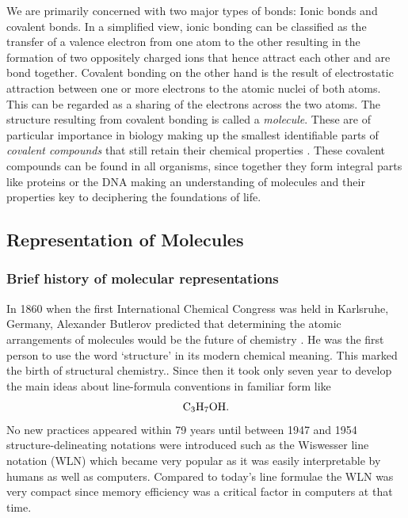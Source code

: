 We are primarily concerned with two major types of bonds: Ionic bonds and covalent bonds.
In a simplified view, ionic bonding can be classified  as the transfer of a valence electron from one atom to the other resulting in the formation of two oppositely charged ions that hence attract each other and are bond together. Covalent bonding on the other hand is the result of electrostatic attraction between one or more electrons to the atomic nuclei of both atoms. This can be regarded as a sharing of the electrons across the two atoms. The structure resulting from covalent bonding is called a \emph{molecule}. These are of particular importance in biology making up the smallest identifiable parts of \emph{covalent compounds} that still retain their chemical properties \cite{molecules}. These covalent compounds can be found in all organisms, since together they form integral parts like proteins or the DNA making an understanding of molecules and their properties key to deciphering the foundations of life.


\subsection{Representation of Molecules}
\subsubsection{Brief history of molecular representations}
In 1860 when the first International Chemical Congress was held in Karlsruhe, Germany, Alexander Butlerov predicted that determining the atomic arrangements of molecules would be the future of chemistry \citep{butlerov1861einiges}. He was the first person to use the word `structure' in its modern chemical meaning. This marked the birth of structural chemistry.\citep{wiswesser1968107}. Since then it took only seven year to develop the main ideas about line-formula conventions in familiar form like $$\mathrm{C_3H_7OH}.$$
No new practices appeared within 79 years until between 1947 and 1954 structure-delineating notations were introduced such as the Wiswesser line notation (WLN) which became very popular as it was easily interpretable by humans as well as computers. Compared to today's line formulae the WLN was very compact since memory efficiency was a critical factor in computers at that time.

